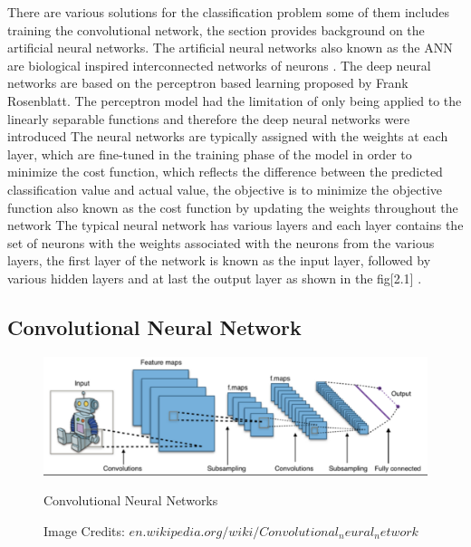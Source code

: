 There are various solutions for the classification problem some of them includes training the convolutional network, the section provides background on the artificial neural networks. The artificial neural networks also known as the ANN are 
biological inspired interconnected networks of neurons \citep{AGATONOVICKUSTRIN2000717}. 
The deep neural networks are based on the  perceptron based learning 
proposed by Frank Rosenblatt\citep{perceptron_learning}. The perceptron model had the limitation of only being applied to the linearly separable functions and therefore the deep neural networks were introduced\citep{perceptron_learning}
The neural networks are typically assigned with the weights at each layer, which are fine-tuned in the training phase of the model in order to minimize the cost function, which reflects the difference between 
the predicted classification value and actual value, the objective is to minimize the objective function also known as the cost function by updating the weights throughout the network\citep{perceptron_learning}
The typical neural network has various layers and each layer contains the set of neurons with the weights associated with the neurons from the various layers, the first layer of the network is known as the input layer, followed 
by various hidden layers and at last the output layer as shown in the fig[2.1] \citep{AGATONOVICKUSTRIN2000717}.

\subsection{Convolutional Neural Network }
\begin{center}
    \begin{figure}[!htp]
        \centering
        \includegraphics[keepaspectratio=true, scale=0.55]{assets/cnn-model_sample}
        \caption{Convolutional Neural Networks}
        \caption{Image Credits: $en.wikipedia.org/wiki/Convolutional_neural_network$}
        \label{fig:colorchannelseperation}
    \end{figure}
    
\end{center}

